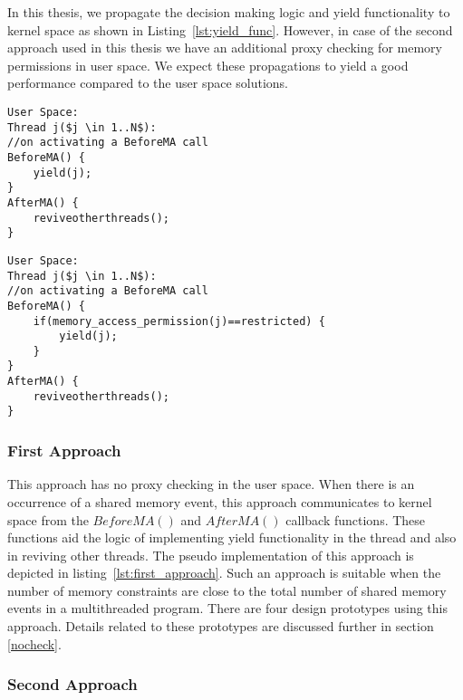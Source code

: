 In this thesis, we propagate the decision making logic and yield functionality to kernel space as shown in Listing~\ref{lst:yield_func}. 
However, in case of the second approach used in this thesis we have an additional proxy checking for memory permissions in user space. 
We expect these propagations to yield a good performance compared to the user space solutions. 

\noindent\begin{minipage}{.45\textwidth}
\begin{lstlisting}[mathescape=true,style=customc,caption={First Approach},frame=tlrb,label={lst:first_approach}]
User Space:
Thread j($j \in 1..N$): 
//on activating a BeforeMA call
BeforeMA() {
	yield(j);
}
AfterMA() {
	reviveotherthreads();
}
\end{lstlisting}
\end{minipage}\hfill
\begin{minipage}{.45\textwidth}
\begin{lstlisting}[mathescape=true,style=customc,caption={Second Approach},frame=tlrb,label={lst:second_approach}]
User Space:
Thread j($j \in 1..N$): 
//on activating a BeforeMA call
BeforeMA() {
	if(memory_access_permission(j)==restricted) {
		yield(j);
	}
}
AfterMA() {
	reviveotherthreads();
}
\end{lstlisting}
\end{minipage}


\subsubsection{First Approach \label{fir_app}}

This approach has no proxy checking in the user space. 
When there is an occurrence of a shared memory event, this approach communicates to kernel space from the $BeforeMA()$ and $AfterMA()$ callback functions. 
These functions aid the logic of implementing yield functionality in the thread and also in reviving other threads. 
The pseudo implementation of this approach is depicted in listing~\ref{lst:first_approach}. 
Such an approach is suitable when the number of memory constraints are close to the total number of shared memory events in a multithreaded program. 
There are four design prototypes using this approach. 
Details related to these prototypes are discussed further in section \ref{nocheck}.

\subsubsection{Second Approach \label{sec_app}}

